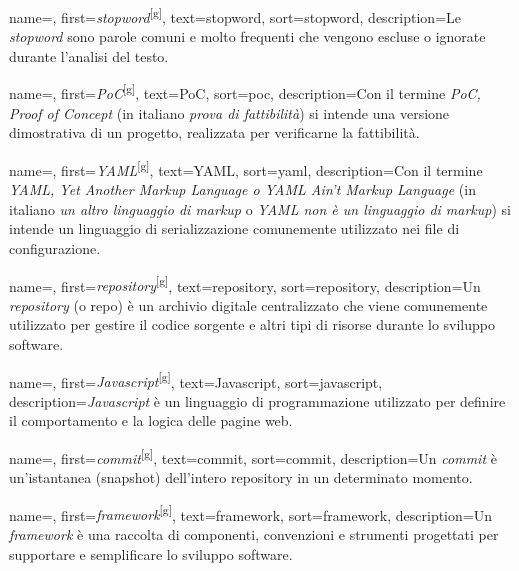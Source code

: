  {
    name=,
    first={\textit{stopword}\textsuperscript{[g]}},
    text=stopword,
    sort=stopword,
    description={Le \textit{stopword} sono parole comuni e molto frequenti che vengono escluse o ignorate durante l’analisi del testo.}
}

 {
    name=,
    first={\textit{PoC}\textsuperscript{[g]}},
    text=PoC,
    sort=poc,
    description={Con il termine \textit{PoC, Proof of Concept} (in italiano \textit{prova di fattibilità}) si intende una versione dimostrativa di un progetto, realizzata per verificarne la fattibilità.}
}

 {
    name=,
    first={\textit{YAML}\textsuperscript{[g]}},
    text=YAML,
    sort=yaml,
    description={Con il termine \textit{YAML, Yet Another Markup Language o YAML Ain’t Markup Language} (in italiano \textit{un altro linguaggio di markup} o \textit{YAML non è un linguaggio di markup}) si intende un linguaggio di serializzazione comunemente utilizzato nei file di configurazione.}
}

 {
    name=,
    first={\textit{repository}\textsuperscript{[g]}},
    text=repository,
    sort=repository,
    description={Un \textit{repository} (o repo) è un archivio digitale centralizzato che viene comunemente utilizzato per gestire il codice sorgente e altri tipi di risorse durante lo sviluppo software.}
}

 {
    name=,
    first={\textit{Javascript}\textsuperscript{[g]}},
    text=Javascript,
    sort=javascript,
    description={\textit{Javascript} è un linguaggio di programmazione utilizzato per definire il comportamento e la logica delle pagine web.}
}

 {
    name=,
    first={\textit{commit}\textsuperscript{[g]}},
    text=commit,
    sort=commit,
    description={Un \textit{commit} è un'istantanea (snapshot) dell’intero \gls{repository} in un determinato momento.}
}

 {
    name=,
    first={\textit{framework}\textsuperscript{[g]}},
    text=framework,
    sort=framework,
    description={Un \textit{framework} è una raccolta di componenti, convenzioni e strumenti progettati per supportare e semplificare lo sviluppo software.}
}

